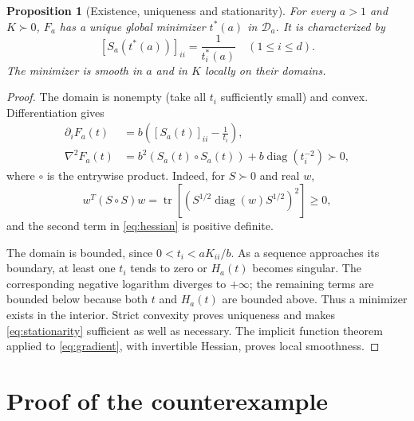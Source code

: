\documentclass[11pt]{article}
\newtheorem{proposition}[theorem]{Proposition}
\theoremstyle{remark}\newtheorem{remark}[theorem]{Remark}
\DeclareMathOperator{\diag}{diag}
\DeclareMathOperator{\tr}{tr}
\begin{document}
\begin{proposition}[Existence, uniqueness and stationarity]\label{prop:convex}
For every $a>1$ and $K\succ0$, $F_a$ has a unique global minimizer $t^*(a)$ in $\mathcal D_a$. It is characterized by
\begin{equation}\label{eq:stationarity}
[S_a(t^*(a))]_{ii}=\frac1{t_i^*(a)}\quad(1\leq i\leq d).
\end{equation}
The minimizer is smooth in $a$ and in $K$ locally on their domains.
\end{proposition}
\begin{proof}
The domain is nonempty (take all $t_i$ sufficiently small) and convex. Differentiation gives
\begin{align}
\partial_i F_a(t)&=b\left([S_a(t)]_{ii}-\frac1{t_i}\right),\label{eq:gradient}\\
\nabla^2F_a(t)&=b^2(S_a(t)\circ S_a(t))+b\diag(t_i^{-2})\succ0,\label{eq:hessian}
\end{align}
where $\circ$ is the entrywise product. Indeed, for $S\succ0$ and real $w$,
\[
w^T(S\circ S)w=\tr\!\left[(S^{1/2}\diag(w)S^{1/2})^2\right]\geq0,
\]
and the second term in \eqref{eq:hessian} is positive definite.

The domain is bounded, since $0<t_i<aK_{ii}/b$. As a sequence approaches its boundary, at least one $t_i$ tends to zero or $H_a(t)$ becomes singular. The corresponding negative logarithm diverges to $+\infty$; the remaining terms are bounded below because both $t$ and $H_a(t)$ are bounded above. Thus a minimizer exists in the interior. Strict convexity proves uniqueness and makes \eqref{eq:stationarity} sufficient as well as necessary. The implicit function theorem applied to \eqref{eq:gradient}, with invertible Hessian, proves local smoothness.
\end{proof}

\section{Proof of the counterexample}
\end{document}
